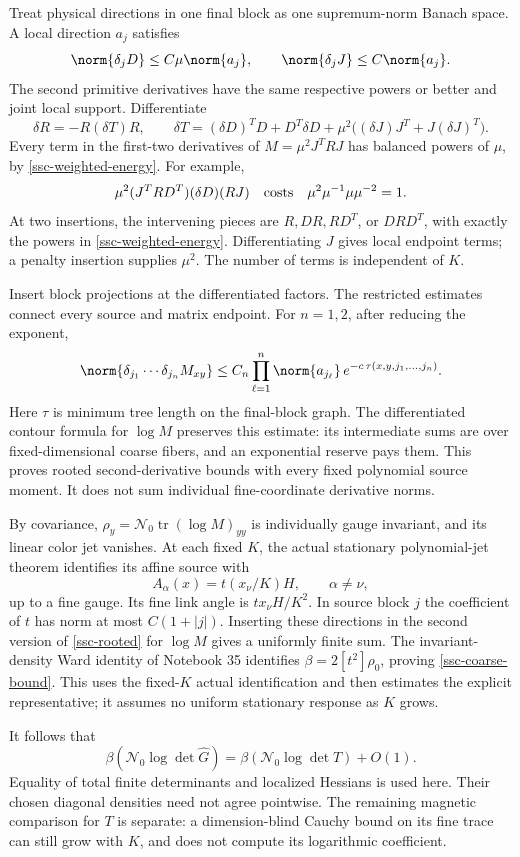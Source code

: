 Treat physical directions in one final block as one supremum-norm
Banach space. A local direction \(a_j\) satisfies
\[
 \norm{\delta_jD}\le C\mu\norm{a_j},\qquad
 \norm{\delta_jJ}\le C\norm{a_j}.
\]
The second primitive derivatives have the same respective powers
or better and joint local support. Differentiate
\[
 \delta R=-R(\delta T)R,\qquad
 \delta T=(\delta D)^TD+D^T\delta D+
       \mu^2\bigl((\delta J)J^T+J(\delta J)^T\bigr).
\]
Every term in the first-two derivatives of
\(M=\mu^2J^TRJ\) has balanced powers of \(\mu\), by
\eqref{ssc-weighted-energy}. For example,
\[
 \mu^2(J^TRD^T)(\delta D)(RJ)
 \quad\hbox{costs}\quad
 \mu^2\mu^{-1}\mu\mu^{-2}=1.
\]
At two insertions, the intervening pieces are \(R,DR,RD^T\),
or \(DRD^T\), with exactly the powers in
\eqref{ssc-weighted-energy}. Differentiating \(J\) gives local
endpoint terms; a penalty insertion supplies \(\mu^2\).
The number of terms is independent of \(K\).

Insert block projections at the differentiated factors. The
restricted estimates connect every source and matrix endpoint.
For \(n=1,2\), after reducing the exponent,
\begin{equation}
 \norm{\delta_{j_1}\cdots\delta_{j_n}M_{xy}}
 \le C_n\prod_{\ell=1}^n\norm{a_{j_\ell}}\,
     e^{-c\,\tau(x,y,j_1,\ldots,j_n)} .
 \label{ssc-rooted}
\end{equation}
Here \(\tau\) is minimum tree length on the final-block graph.
The differentiated contour formula for \(\log M\) preserves this
estimate: its intermediate sums are over fixed-dimensional coarse
fibers, and an exponential reserve pays them. This proves rooted
second-derivative bounds with every fixed polynomial source moment.
It does not sum individual fine-coordinate derivative norms.

By covariance, \(\rho_y=\mathcal N_0\operatorname{tr}
(\log M)_{yy}\) is individually gauge invariant, and its linear
color jet vanishes. At each fixed \(K\), the actual stationary
polynomial-jet theorem identifies its affine source with
\[
 A_\alpha(x)=t(x_\nu/K)H,\qquad \alpha\ne\nu ,
\]
up to a fine gauge. Its fine link angle is \(t x_\nu H/K^2\).
In source block \(j\) the coefficient of \(t\) has norm at most
\(C(1+|j|)\). Inserting these directions in the second version of
\eqref{ssc-rooted} for \(\log M\) gives a uniformly finite sum.
The invariant-density Ward identity of Notebook 35 identifies
\(\beta=2[t^2]\rho_0\), proving \eqref{ssc-coarse-bound}.
This uses the fixed-\(K\) actual identification and then estimates
the explicit representative; it assumes no uniform stationary
response as \(K\) grows.

It follows that
\begin{equation}
 \beta(\mathcal N_0\log\det\widehat G)
       =\beta(\mathcal N_0\log\det T)+O(1).
 \label{ssc-scalar-reduction}
\end{equation}
Equality of total finite determinants and localized Hessians is
used here. Their chosen diagonal densities need not agree pointwise.
The remaining magnetic comparison for \(T\) is separate: a
dimension-blind Cauchy bound on its fine trace can still grow with
\(K\), and does not compute its logarithmic coefficient.
